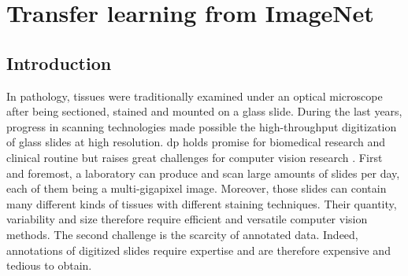 \chapter{Transfer learning from ImageNet}
\label{chap:comp}




\section{Introduction}

In pathology, tissues were traditionally examined under an optical microscope after being sectioned, stained and mounted on a glass slide. During the last years, progress in scanning technologies made possible the high-throughput digitization of glass slides at high resolution. \acrshort{dp} holds promise for biomedical research and clinical routine but raises great challenges for computer vision research \parencite{automated-histology-signal-proc-2014}. 
First and foremost, a laboratory can produce and scan large amounts of slides per day, each of them being a multi-gigapixel image. Moreover, those slides can contain many different kinds of tissues with different staining techniques. Their quantity, variability and size therefore require efficient and versatile computer vision methods. The second challenge is the scarcity of annotated data. Indeed, annotations of digitized slides require expertise and are therefore expensive and tedious to obtain.

